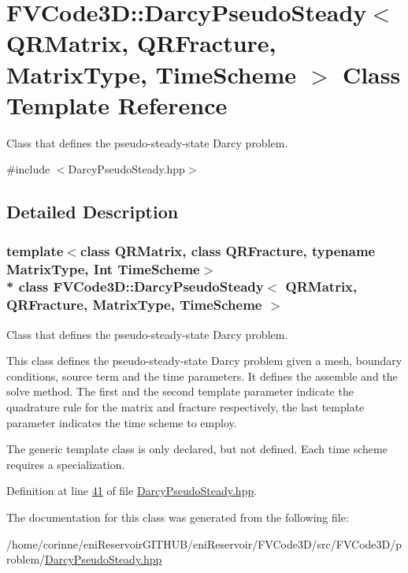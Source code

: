 \hypertarget{classFVCode3D_1_1DarcyPseudoSteady}{}\section{F\+V\+Code3D\+:\+:Darcy\+Pseudo\+Steady$<$ Q\+R\+Matrix, Q\+R\+Fracture, Matrix\+Type, Time\+Scheme $>$ Class Template Reference}
\label{classFVCode3D_1_1DarcyPseudoSteady}


Class that defines the pseudo-\/steady-\/state Darcy problem.  




{\ttfamily \#include $<$Darcy\+Pseudo\+Steady.\+hpp$>$}



\subsection{Detailed Description}
\subsubsection*{template$<$class Q\+R\+Matrix, class Q\+R\+Fracture, typename Matrix\+Type, Int Time\+Scheme$>$\\*
class F\+V\+Code3\+D\+::\+Darcy\+Pseudo\+Steady$<$ Q\+R\+Matrix, Q\+R\+Fracture, Matrix\+Type, Time\+Scheme $>$}

Class that defines the pseudo-\/steady-\/state Darcy problem. 

This class defines the pseudo-\/steady-\/state Darcy problem given a mesh, boundary conditions, source term and the time parameters. It defines the assemble and the solve method. The first and the second template parameter indicate the quadrature rule for the matrix and fracture respectively, the last template parameter indicates the time scheme to employ.

The generic template class is only declared, but not defined. Each time scheme requires a specialization. 

Definition at line \hyperlink{DarcyPseudoSteady_8hpp_source_l00041}{41} of file \hyperlink{DarcyPseudoSteady_8hpp_source}{Darcy\+Pseudo\+Steady.\+hpp}.



The documentation for this class was generated from the following file\+:\begin{DoxyCompactItemize}
\item 
/home/corinne/eni\+Reservoir\+G\+I\+T\+H\+U\+B/eni\+Reservoir/\+F\+V\+Code3\+D/src/\+F\+V\+Code3\+D/problem/\hyperlink{DarcyPseudoSteady_8hpp}{Darcy\+Pseudo\+Steady.\+hpp}\end{DoxyCompactItemize}
